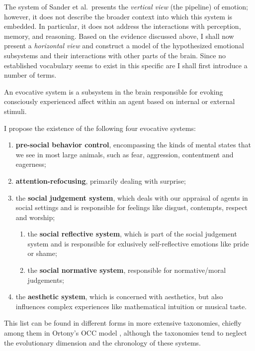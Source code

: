 The system of Sander et al.\ presents the {\em vertical view} (the pipeline) of emotion; however, it does not describe the broader context into which this system is embedded. In particular, it does not address the interactions with perception, memory, and reasoning. Based on the evidence discussed above, I shall now present a {\em horizontal view} and construct a model of the hypothesized emotional subsystems and their interactions with other parts of the brain. Since no established vocabulary seems to exist in this specific are I shall first introduce a number of terms.

\begin{definition}
An evocative system is a subsystem in the brain responsible for evoking consciously experienced affect within an agent based on internal or external stimuli.
\end{definition} 

I propose the existence of the following four evocative systems:

\begin{enumerate}
	\item \textbf{pre-social behavior control}, encompassing the kinds of mental states that we see in most large animals, such as fear, aggression, contentment and eagerness;
	\item \textbf{attention-refocusing}, primarily dealing with surprise;
	\item the \textbf{social judgement system}, which deals with our appraisal of agents in social settings and is responsible for feelings like disgust, contempts, respect and worship;
		\begin{enumerate}
				\item the \textbf{social reflective system}, which is part of the social judgement system and is responsible for exlusively self-reflective emotions like pride or shame;
				\item the \textbf{social normative system}, responsible for normative/moral judgements;
		\end{enumerate}
	\item the \textbf{aesthetic system}, which is concerned with aesthetics, but also influences complex experiences like mathematical intuition or musical taste.
\end{enumerate}

This list can be found in different forms in more extensive taxonomies, chiefly among them in Ortony's OCC model \cite{ortony1988}, although the taxonomies tend to neglect the evolutionary dimension and the chronology of these systems.

